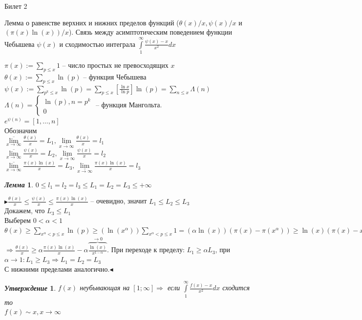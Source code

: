 \documentclass[a4paper,12pt]{article}
\newtheorem{utv}{\textit{Утверждение}}
\newtheorem{lem}{\textit{Лемма}}
\newcommand{\TE}{\theta}
\newcommand{\SI}{\psi}
\newcommand{\pb}{\blacktriangleright}
\newcommand{\pe}{\blacktriangleleft}
\newcommand{\Ra}{\Rightarrow}
\newcommand{\SL}{\sum\limits}
\newcommand{\IL}{\int\limits}
\newcommand{\os}{\left(}
\newcommand{\cs}{\right)}
\begin{document}
\newpage
\begin{mybox2}{\hypertarget{bil2}{Билет 2}}
\begin{formbox}{}
Лемма о равенстве верхних и нижних пределов функций ($\TE(x)/x, \SI(x)/x$ и $\os\pi(x)\ln(x)\cs/x$). Связь между асимптотическим поведением функции Чебышева $\SI(x)$ и сходимостью интеграла $\IL_1^\infty \frac{\SI(x)-x}{x^2}dx$
\end{formbox}
$\pi(x):=\SL_{p\le x}1$ -- число простых не превосходящих $x$\\
$\theta(x):=\SL_{p\le x}\ln(p)$ -- функция Чебышева\\
$\SI(x):=\SL_{p^k\le x} \ln(p) = \SL_{p\le x}\left[\frac{\ln x}{\ln p}\right]\ln(p) = \SL_{n \le x} \Lambda(n)$\\
$\Lambda(n) =\begin{cases}  \ln(p), n = p^k\\0 \end{cases}$ -- функция Мангольта.\\
$e^{\SI(n)} = [1,\dots,n]$\\

Обозначим\\
$\underset{x\to\infty}{\overline{\lim}} \frac{\TE(x)}{x} = L_1, \underset{x\to\infty}{\underline{\lim}} \frac{\TE(x)}{x}= l_1$\\
$\underset{x\to\infty}{\overline{\lim}} \frac{\SI(x)}{x} = L_2, \underset{x\to\infty}{\underline{\lim}} \frac{\SI(x)}{x} = l_2$\\
$\underset{x\to\infty}{\overline{\lim}} \frac{\pi(x)\ln(x)}{x} = L_3, \underset{x\to\infty}{\underline{\lim}} \frac{\pi(x)\ln(x)}{x} = l_3$\\

\begin{formbox}{}
\begin{lem}
$0\le l_1 = l_2 = l_3 \le L_1 = L_2 = L_3 \le +\infty$
\end{lem}
\end{formbox}
$\pb \frac{\TE(x)}{x} \le \frac{\SI(x)}{x}\le \frac{\pi(x)\ln(x)}{x}$ -- очевидно, значит $L_1 \le L_2 \le L_3$\\
Докажем, что $L_3 \le L_1$\\
Выберем $0<\alpha<1$\\
$\TE(x)  \ge \SL_{x^\alpha <p\le x} \ln(p) \ge \os \ln(x^\alpha) \cs  \SL_{x^\alpha <p\le x} 1 = \os \alpha \ln(x)\cs  \os \pi(x) - \pi(x^\alpha)  \cs \ge \ln(x) \os \pi(x) - x^\alpha  \cs  $\\
$\Ra \frac{\TE(x)}{x} \ge \alpha \frac{\pi(x)\ln(x)}{x} - \alpha \overbrace{\frac{\ln(x)}{x^{1-\alpha}}}^{\to 0}  $. При переходе к пределу: $L_1 \ge \alpha L_3$, при $\alpha \to 1: L_1\ge L_3\Ra L_1 = L_2 = L_3$\\
С нижними пределами аналогично.$\pe$\\

\begin{formbox}{}
\begin{utv} $f(x)$ неубывающая на $[1;\infty]\Ra$ если $\IL_1^\infty \frac{f(x) - x}{x^2}dx$ сходится то \\$f(x)\sim x, x\to\infty$
\end{utv}
\end{formbox}

\end{mybox2}
\end{document}
